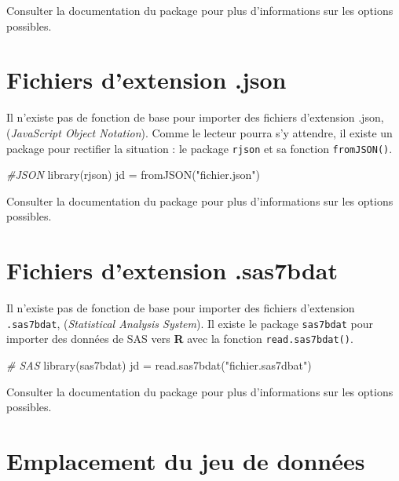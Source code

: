 \documentclass[
]{book}
\newenvironment{Shaded}{}{}
\newcommand{\CommentTok}[1]{\textit{#1}}
\newcommand{\FunctionTok}[1]{#1}
\newcommand{\NormalTok}[1]{#1}
\newcommand{\OtherTok}[1]{#1}
\newcommand{\StringTok}[1]{#1}
\begin{document}
Consulter la documentation du package pour plus d'informations sur les options possibles.

\hypertarget{fichiers-dextension-.json}{%
\section{Fichiers d'extension .json}\label{fichiers-dextension-.json}}

Il n'existe pas de fonction de base pour importer des fichiers d'extension .json, (\emph{JavaScript Object Notation}). Comme le lecteur pourra s'y attendre, il existe un package pour rectifier la situation : le package \texttt{rjson} et sa fonction \texttt{fromJSON()}.

\begin{Shaded}
\begin{Highlighting}[]
\CommentTok{\#JSON}
\FunctionTok{library}\NormalTok{(rjson)}
\NormalTok{jd }\OtherTok{=} \FunctionTok{fromJSON}\NormalTok{(}\StringTok{"fichier.json"}\NormalTok{)}
\end{Highlighting}
\end{Shaded}

Consulter la documentation du package pour plus d'informations sur les options possibles.

\hypertarget{fichiers-dextension-.sas7bdat}{%
\section{Fichiers d'extension .sas7bdat}\label{fichiers-dextension-.sas7bdat}}

Il n'existe pas de fonction de base pour importer des fichiers d'extension \texttt{.sas7bdat}, (\emph{Statistical Analysis System}). Il existe le package \texttt{sas7bdat} pour importer des données de SAS vers \textbf{R} avec la fonction \texttt{read.sas7bdat()}.

\begin{Shaded}
\begin{Highlighting}[]
\CommentTok{\# SAS}
\FunctionTok{library}\NormalTok{(sas7bdat)}
\NormalTok{jd }\OtherTok{=} \FunctionTok{read.sas7bdat}\NormalTok{(}\StringTok{"fichier.sas7dbat"}\NormalTok{)}
\end{Highlighting}
\end{Shaded}

Consulter la documentation du package pour plus d'informations sur les options possibles.

\hypertarget{emplacement-du-jeu-de-donnuxe9es}{%
\section{Emplacement du jeu de données}\label{emplacement-du-jeu-de-donnuxe9es}}
\end{document}
